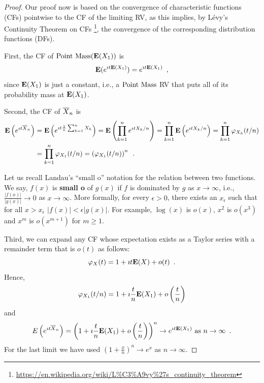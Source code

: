 \begin{prop}
{\normalsize
\begin{proof}
Our proof now is based on the convergence of characteristic functions (CFs) pointwise to the CF of the limiting RV, as this implies, by L\'evy's Continuity Theorem on CFs \footnote{\url{https://en.wikipedia.org/wiki/L\%C3\%A9vy\%27s_continuity_theorem}}, the convergence of the corresponding distribution functions (DFs).  

First, the CF of $\mbox{{\rm Point~Mass}}(\mathbf{E}(X_1))$ is 
\[
\mathbf{E}(e^{\imath t \mathbf{E}(X_1)})=e^{\imath t \mathbf{E}(X_1)} \enspace,
\]
since $\mathbf{E}(X_1)$ is just a constant, i.e., a $\mbox{{\rm Point~Mass}}$ RV that puts all of its probability mass at $\mathbf{E}(X_1)$.  

Second, the CF of $\overline{X}_n$ is 
\begin{align*}
\mathbf{E} \left( e^{\imath t \overline{X}_n}\right)
&= \mathbf{E} \left( e^{\imath t \frac{1}{n} \sum_{k=1}^n X_k} \right) = \mathbf{E} \left( \prod_{k=1}^n e^{\imath t X_k/n} \right) = \prod_{k=1}^n \mathbf{E} \left( e^{\imath t X_k/n} \right) = \prod_{k=1}^n \varphi_{X_k}(t/n)\\ 
&= \prod_{k=1}^n \varphi_{X_1}(t/n) =\left(\varphi_{X_1}(t/n)\right)^n \enspace .
\end{align*}

Let us recall Landau's ``small o'' notation for the relation between two functions.  
We say,  $f(x)$ is {\bf small o} of $g(x)$ if $f$ is dominated by $g$ as $x \to \infty$, i.e., $\frac{|f(x)|}{|g(x)|} \to 0$ as $x \to \infty$.  
More formally, for every $\epsilon > 0$, there exists an $x_{\epsilon}$ such that for all $x > x_{\epsilon}$ $|f(x)| < \epsilon |g(x)|$.  
For example, $\log(x)$ is $o(x)$, $x^2$ is $o(x^3)$ and $x^m$ is $o(x^{m+1})$ for $m\geq 1$.  

Third, we can expand any CF whose expectation exists as a Taylor series with a remainder term that is $o(t)$ as follows:
\[
\varphi_X(t) = 1 + \imath t \mathbf{E}(X) + o(t) \enspace .
\]
Hence,
\[
\varphi_{X_1}(t/n) = 1 + \imath \frac{t}{n} \mathbf{E}(X_1) + o\left(\frac{t}{n}\right) 
\]
and
\[
E \left( e^{\imath t \overline{X}_n}\right) = \left( 1 + \imath \frac{t}{n} \mathbf{E}(X_1) + o\left(\frac{t}{n}\right) \right)^n
\to e^{\imath t \mathbf{E}(X_1)} \text{ as } n \to \infty \enspace .
\]
For the last limit we have used $\left( 1+\frac{x}{n}\right)^n \to e^x$ as $n \to \infty$.


\end{proof}}
\end{prop}
